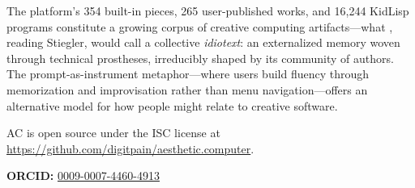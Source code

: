 \documentclass[10pt,letterpaper,twocolumn]{article}
\begin{document}
The platform's 354 built-in pieces, 265 user-published works, and 16,244 KidLisp programs constitute a growing corpus of creative computing artifacts---what \citet{staunaes2021stiegler}, reading Stiegler, would call a collective \emph{idiotext}: an externalized memory woven through technical prostheses, irreducibly shaped by its community of authors. The prompt-as-instrument metaphor---where users build fluency through memorization and improvisation rather than menu navigation---offers an alternative model for how people might relate to creative software.

AC is open source under the ISC license at \url{https://github.com/digitpain/aesthetic.computer}.

\vspace{0.5em}
\noindent\textbf{ORCID:} \href{https://orcid.org/0009-0007-4460-4913}{0009-0007-4460-4913}




\end{document}
